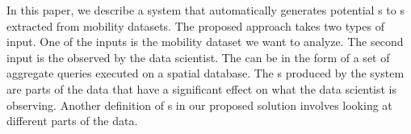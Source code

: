 In this paper, we describe a system that automatically generates potential {\explanation}s to {\fact}s extracted from mobility datasets. The proposed approach takes two types of input. One of the inputs is the mobility dataset we want to analyze. The second input is the {\fact} observed by the data scientist. The {\fact} can be in the form of a set of aggregate queries executed on a spatial database. 
The {\explanation}s produced by the system are parts of the data that have a significant effect on what the {\fact} data scientist is observing. %
Another definition of {\explanation}s in our proposed solution involves looking at different parts of the data. 


